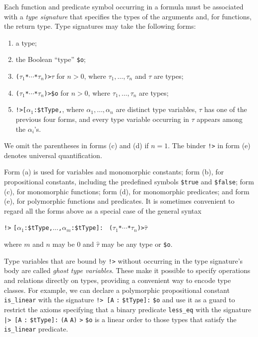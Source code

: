 Each function and predicate symbol occurring in a formula must be associated
with a {\em type signature\/} that specifies the types of the arguments and, for
functions, the return type. Type signatures may take the following forms:
%
\begin{enumerate}
\item[(a)] a type;
\item[(b)] the Boolean ``type'' {\tt \$o}; %
\item[(c)] {\tt ($\tau_1$\;*\;${\cdots}$\;*\;$\tau_n$)\;>\;$\tau$} for $n > 0$,
where $\tau_1,\dots,\tau_n$ and $\tau$ are types;
\item[(d)] {\tt ($\tau_1$\;*\;${\cdots}$\;*\;$\tau_n$)\;>\;\$o} for $n > 0$,
where $\tau_1,\dots,\tau_n$ are types;
\item[(e)] {\tt !>\;[$\alpha_1$\::\:\$tType,}\;{\tt ${\dots}$,}\;{\tt
$\alpha_n$\::\:\$tType]:\;$\tau$}, where $\alpha_1,\dots,\alpha_n$ are distinct
type variables, $\tau$ has one of the previous four forms, and every type
variable occurring in $\tau$ appears among the $\alpha_i$'s.
\end{enumerate}
%
We omit the parentheses in forms (c) and (d) if $n = 1$. The binder {\tt !>} in
form (e) denotes %
universal quantification.

Form (a) is used for variables and monomorphic constants; form (b), for
propositional constants, including the predefined symbols {\tt \$true} and
{\tt \$false}; form (c), for monomorphic functions; form (d), for monomorphic
predicates; and form (e), for polymorphic functions and predicates.
It is sometimes convenient to regard all the forms above as a special case of
the general syntax
\begin{center}
{\tt !>} {\tt [$\alpha_1$\;:\;\$tType,\;${\dots}$,\;$\alpha_m$\;:\;\$tType]:} {\tt
($\tau_1$\;*\;${\cdots}$\;*\;$\tau_n$)\;>\;$\widehat \tau$}
\end{center}
where $m$ and $n$ may be 0 and $\widehat \tau$ may be any type or {\tt \$o}.

Type variables that are bound by {\tt !>} without
occurring in the type signature's body are called \emph{ghost type variables}.
These make it possible to specify operations and relations directly on types,
providing a convenient way to encode type classes.
For example, we can declare a polymorphic propositional
constant {\tt is\_linear} with the signature
{\tt !>}~{\tt [A} {\tt :} {\tt \$tType]:} {\tt \$o} and use it as a guard to restrict the
axioms specifying that a binary predicate {\tt less\_eq} with the signature
{\tt |>}~{\tt [A} {\tt :} {\tt \$tType]:} {\tt (A} {\tt *} {\tt A)} {\tt >} {\tt \$o}
is a linear order to those types that satisfy the {\tt is\_linear} predicate.

